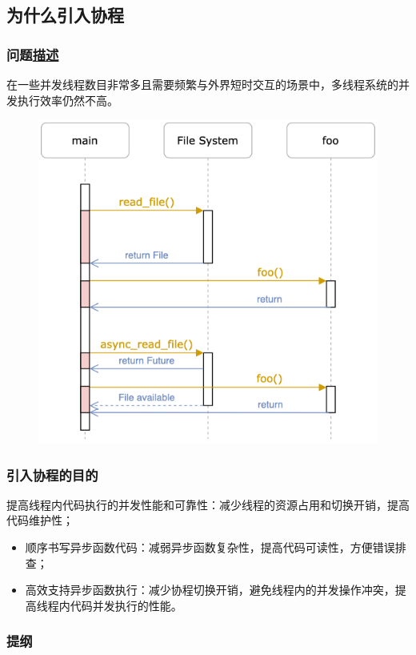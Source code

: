 \subsection{为什么引入协程}
% 
\begin{frame}[fragile]
    \frametitle{问题\href{https://os.phil-opp.com/async-await/\#example}{描述}}
% 
在一些并发线程数目非常多且需要频繁与外界短时交互的场景中，多线程系统的并发执行效率仍然不高。
% 

  \begin{figure}
    \centering
    \includegraphics[width=0.45\linewidth]{figs/async-example.png}
  \end{figure}



% 

\end{frame}
\begin{frame}[fragile]
    \frametitle{引入协程的目的}

提高线程内代码执行的并发性能和可靠性：减少线程的资源占用和切换开销，提高代码维护性； \pause
    \begin{itemize}
        \item 顺序书写异步函数代码：减弱异步函数复杂性，提高代码可读性，方便错误排查； \pause
        \item 高效支持异步函数执行：减少协程切换开销，避免线程内的并发操作冲突，提高线程内代码并发执行的性能。
    \end{itemize}
\end{frame}
% 
\begin{frame}
\frametitle{提纲} %
\tableofcontents %
\end{frame}
